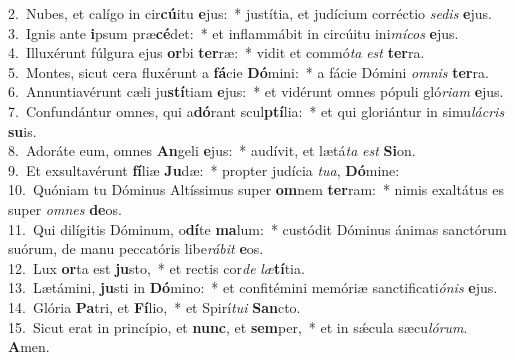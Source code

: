 {2.~}Nubes, et calígo in cir\textbf{cú}itu \textbf{e}jus:~* justítia, et judícium corréctio \textit{se}\textit{dis} \textbf{e}jus.\\
{3.~}Ignis ante \textbf{i}psum præ\textbf{cé}det:~* et inflammábit in circúitu ini\textit{mí}\textit{cos} \textbf{e}jus.\\
{4.~}Illuxérunt fúlgura ejus \textbf{or}bi \textbf{ter}ræ:~* vidit et commó\textit{ta} \textit{est} \textbf{ter}ra.\\
{5.~}Montes, sicut cera fluxérunt a \textbf{fá}cie \textbf{Dó}mini:~* a fácie Dómini \textit{om}\textit{nis} \textbf{ter}ra.\\
{6.~}Annuntiavérunt cæli ju\textbf{stí}tiam \textbf{e}jus:~* et vidérunt omnes pópuli gló\textit{ri}\textit{am} \textbf{e}jus.\\
{7.~}Confundántur omnes, qui a\textbf{dó}rant scul\textbf{ptí}lia:~* et qui gloriántur in simu\textit{lá}\textit{cris} \textbf{su}is.\\
{8.~}Adoráte eum, omnes \textbf{An}geli \textbf{e}jus:~* audívit, et lætá\textit{ta} \textit{est} \textbf{Si}on.\\
{9.~}Et exsultavérunt \textbf{fí}liæ \textbf{Ju}dæ:~* propter judícia \textit{tu}\textit{a}, \textbf{Dó}mine:\\
{10.~}Quóniam tu Dóminus Altíssimus super \textbf{om}nem \textbf{ter}ram:~* nimis exaltátus es super \textit{om}\textit{nes} \textbf{de}os.\\
{11.~}Qui dilígitis Dóminum, o\textbf{dí}te \textbf{ma}lum:~* custódit Dóminus ánimas sanctórum suórum, de manu peccatóris libe\textit{rá}\textit{bit} \textbf{e}os.\\
{12.~}Lux \textbf{or}ta est \textbf{ju}sto,~* et rectis cor\textit{de} \textit{læ}\textbf{tí}tia.\\
{13.~}Lætámini, \textbf{ju}sti in \textbf{Dó}mino:~* et confitémini memóriæ sanctificati\textit{ó}\textit{nis} \textbf{e}jus.\\
{14.~}Glória \textbf{Pa}tri, et \textbf{Fí}lio,~* et Spirí\textit{tu}\textit{i} \textbf{San}cto.\\
{15.~}Sicut erat in princípio, et \textbf{nunc}, et \textbf{sem}per,~* et in sǽcula sæcu\textit{ló}\textit{rum}. \textbf{A}men.\\

